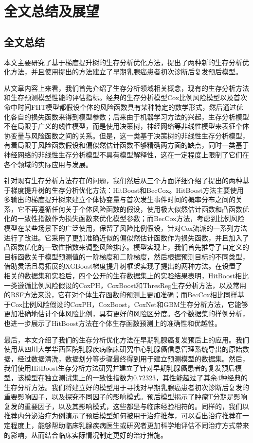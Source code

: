 \chapter{全文总结及展望}

\section{全文总结}
本文主要研究了基于梯度提升树的生存分析优化方法，提出了两种新的生存分析优化方法，并且使用提出的方法建立了早期乳腺癌患者初次诊断后复发预后模型。

从文章内容上来看，我们首先介绍了生存分析领域相关概念，现有的生存分析方法和生存预测模型性能的评估指标。经典的生存分析模型Cox比例风险模型以及首次命中时间FHT模型都假设个体的风险函数具有某种特定的数学形式，然后通过优化各自的损失函数来得到模型参数；后来由于机器学习方法的兴起，生存分析模型不在局限于广义的线性模型，而是使用决策树，神经网络等非线性模型来表征个体协变量与风险函数之间的关系。但是，这一类基于决策树的非线性生存分析模型，有着局限于风险函数假设和偏似然估计函数不够精确两方面的缺点，同时一类基于神经网络的非线性生存分析模型不具有模型解释性，这在一定程度上限制了它们在各个领域的实际应用与发展。

针对现有生存分析方法存在的问题，我们然后从三个方面详细介绍了提出的两种基于梯度提升树的生存分析优化方法：HitBoost和BecCox。HitBoost方法主要使用多输出的梯度提升树来建立个体协变量与首次发生事件时间的概率分布之间的关系，它不再遵循任何关于个体风险函数的假设，使用极大似然估计函数和凸函数优化的一致性指数作为损失函数来优化模型参数；而BecCox方法，考虑到比例风险模型在某些场景下的广泛使用，保留了风险比例假设，针对Cox流派的一系列方法进行了改进。它采用了更加准确近似的偏似然估计函数作为损失函数，并且加入了凸函数优化的一致性指数来调整风险排序。模型实现上，我们首先推导了自定义的目标函数关于模型预测值的一阶梯度和二阶梯度，然后根据预测目标的不同类型，借助灵活且易拓展的XGBoost梯度提升树框架实现了提出的两种方法。在设置了相关的数据集和实验后，四个公开的生存数据集上的实验结果表明，HitBoost相比一类遵循比例风险假设的CoxPH，CoxBoost和ThresReg生存分析方法，以及常用的RSF方法来说，它在对个体生存函数的预测上更加准确；而BecCox相比同样基于Cox比例风险假设的CoxPH，CoxBoost，CoxNet和GBM生存分析方法，它能够更加准确地估计个体风险比例，具有更好的风险区分度。各个数据集的样例分析，也进一步展示了HitBoost方法在个体生存函数预测上的准确性和优越性。

最后，本文介绍了我们的生存分析优化方法在早期乳腺癌复发预后上的应用。我们使用从四川大学华西医院乳腺疾病临床研究中心乳腺癌信息管理系统导出的原始数据，经过数据清洗，数据划分等步骤最终得到用于建立预测模型的数据集。然后，我们使用HitBoost生存分析方法研究并建立了针对早期乳腺癌患者的复发预后模型，该模型在独立测试集上的一致性指数为0.72323，其性能超过了其余4种经典的生存分析方法。我们将建立好的模型用于寻找对早期乳腺癌患者初次诊断后复发的重要影响因子，以及探究不同因子的影响模式。预后模型揭示了肿瘤T分期是影响复发的重要因子，以及其影响模式，这些都是与临床经验相符的。同样的，我们以推荐内分泌治疗为例演示了预后模型如何被用于治疗推荐，可以看出治疗推荐在一定程度上，能够帮助临床乳腺疾病医生或研究者更加科学地评估不同治疗方式带来的影响，从而结合临床实际情况制定更好的治疗措施。


